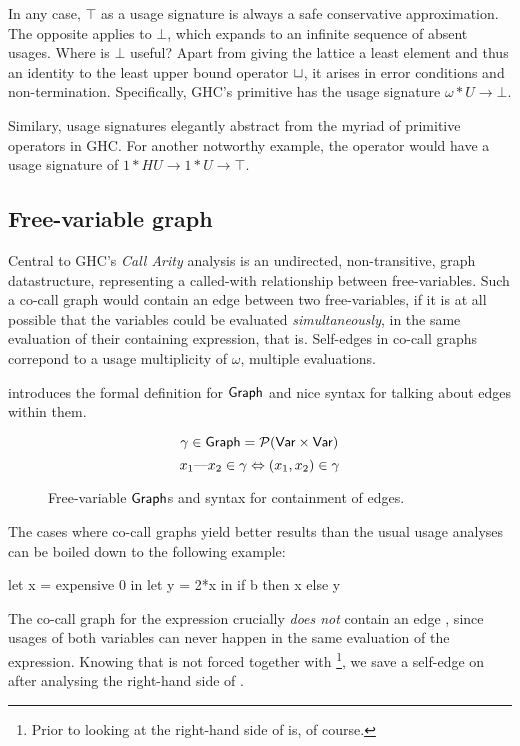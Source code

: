 In any case, $\top$ as a usage signature is always a safe conservative approximation. 
The opposite applies to $\bot$, which expands to an infinite sequence of absent usages. 
Where is $\bot$ useful? 
Apart from giving the lattice a least element and thus an identity to the least upper bound operator $\sqcup$, it arises in error conditions and non-termination. 
Specifically, GHC's primitive  has the usage signature $\omega*U \to \bot$.

Similary, usage signatures elegantly abstract from the myriad of primitive operators in GHC.
For another notworthy example, the  operator would have a usage signature of $1*HU \to 1*U \to \top$.

\subsection{Free-variable graph}\label{sec:graph}


Central to GHC's \emph{Call Arity} analysis \parencite{callarity} is an undirected, non-transitive, graph datastructure, representing a called-with relationship between free-variables.
Such a co-call graph would contain an edge between two free-variables, if it is at all possible that the variables could be evaluated \emph{simultaneously}, in the same evaluation of their containing expression, that is.
Self-edges in co-call graphs correpond to a usage multiplicity of $\omega$, \eg multiple evaluations.

 introduces the formal definition for $\text{\textsf{Graph}}$ and nice syntax for talking about edges within them.

\begin{figure}
\[
\gamma \in \text{\textsf{Graph}} = \mathcal{P}(\text{\textsf{Var}} \times \text{\textsf{Var}})
\]
\[
x_1\text{---}x_2\in\gamma \Leftrightarrow (x_1,x_2) \in \gamma
\]
\caption{Free-variable $\text{\textsf{Graph}}$s and syntax for containment of edges.}
\label{fig:graph}
\end{figure}

The cases where co-call graphs yield better results than the usual usage analyses can be boiled down to the following example:

\begin{haskellcode}
let x = expensive 0
in let y = 2*x
   in if b 
      then x 
      else y
\end{haskellcode}

The co-call graph for the  expression crucially \emph{does not} contain an edge , since usages of both variables can never happen in the same evaluation of the expression.
Knowing that  is not forced together with \footnote{Prior to looking at the right-hand side of  is, of course.}, we save a self-edge on  after analysing the right-hand side of .

